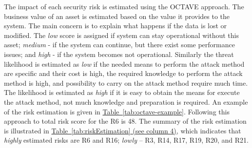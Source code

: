 \documentclass[runningheads]{llncs}
\begin{document}
The impact of each security risk is estimated using the OCTAVE approach. The business value of an asset is estimated based on the value it provides to the system. The main concern is to explain what happens if the data is lost or modified. The \textit{low} score is assigned if system can stay operational without this asset; \textit{medium} - if the system can continue, but there exist some performance issues; and \textit{high} - if the system becomes not operational. Similarly the threat {likelihood} is estimated as \textit{low} if the needed means to perform the attack method are specific and their cost is high, the required knowledge to perform the attack method is high, and possibility to carry on the attack method require much time. The likelihood is estimated as \textit{high} if it is easy to obtain the means for execute the attack method, not much knowledge and preparation is required. An example of the risk estimation is given in \hyperref[tab:octave-example]{Table~\ref{tab:octave-example}}. Following this approach to total risk score for the R6 is 48. The summary of the risk estimation is illustrated in \hyperref[tab:riskEstimation]{Table~\ref{tab:riskEstimation} (see column 4)}, which indicates that \textit{highly} estimated risks are 
R6 and R16; \textit{lowly} -- R3, R14, R17, R19, R20, and R21.
\end{document}
